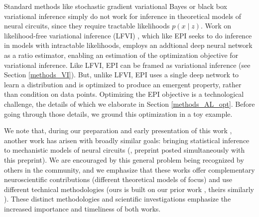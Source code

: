 \documentclass[11pt]{article}
\begin{document}
Standard methods like stochastic gradient variational Bayes \cite{kingma2013auto} or black box variational inference \cite{ranganath2014black} simply do not work for inference in theoretical models of neural circuits, since they require tractable likelihoods $p(x \mid z)$.
Work on likelihood-free variational inference (LFVI) \cite{tran2017hierarchical}, which like EPI seeks to do inference in models with intractable likelihoods, employs an addtional deep neural network as a ratio estimator, enabling an estimation of the optimization objective for variational inference.
Like LFVI, EPI can be framed as variational inference (see Section \ref{methods_VI}).
But, unlike LFVI, EPI uses a single deep network to learn a distribution and is optimized to produce an emergent property, rather than condition on data points.  Optimizing the EPI objective is a technological challenge, the details of which we elaborate in Section \ref{methods_AL_opt}.  
 Before going through those details, we ground this optimization in a toy example.
 
 We note that, during our preparation and early presentation of this work \cite{bittner2019degenerate, bittner2019examining}, another work has arisen with broadly similar goals: bringing statistical inference to mechanistic models of neural circuits (\cite{nonnenmacher2018sbi, desitler2019statistical, gonccalves2019training}, preprint posted simultaneously with this preprint).
We are encouraged by this general problem being recognized by others in the community, and we emphasize that these works offer complementary neuroscientific contributions (different theoretical models of focus) and use different technical methodologies (ours is built on our prior work \cite{loaiza2017maximum}, theirs similarly \cite{LueckmannGoncalves_17}).
These distinct methodologies and scientific investigations emphasize the increased importance and timeliness of both works. 
\end{document}

